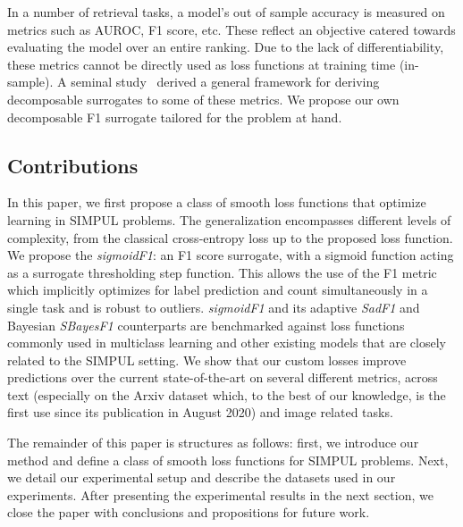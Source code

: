 
In a number of retrieval tasks, a model's out of sample accuracy is measured
on metrics such as AUROC, F1 score, etc. These reflect an objective catered
towards evaluating the model over an entire ranking. Due to the lack of
differentiability, these metrics cannot be directly used as loss functions at
training time (in-sample). A seminal study~\cite{optimizableLosses} derived a
general framework for deriving decomposable surrogates to some of these
metrics. We propose our own decomposable F1 surrogate tailored for the problem
at hand.

\subsection{Contributions}
In this paper, we first propose a class of smooth loss functions that optimize
learning in SIMPUL problems. The generalization encompasses different levels
of complexity, from the classical cross-entropy loss up to the proposed loss
function. We propose the \emph{sigmoidF1}: an F1 score surrogate, with a
sigmoid function acting as a surrogate thresholding step function. This allows
the use of the F1 metric which implicitly optimizes for label prediction and
count simultaneously in a single task and is robust to outliers.
\emph{sigmoidF1} and its adaptive \emph{SadF1} and Bayesian \emph{SBayesF1}
counterparts are benchmarked against loss functions commonly used in
multiclass learning and other existing models that are closely related to the
SIMPUL setting. We show that our custom losses improve predictions over the
current  state-of-the-art on several different metrics, across text
(especially on the Arxiv dataset which, to the best of our knowledge, is the
first use since its publication in August 2020) and image related tasks.

The remainder of this paper is structures as follows: first, we introduce
our method and define a class of smooth loss functions for SIMPUL problems.
Next, we detail our experimental setup and describe the datasets used in our
experiments. After presenting the experimental results in the next section,
we close the paper with conclusions and propositions for future work.

